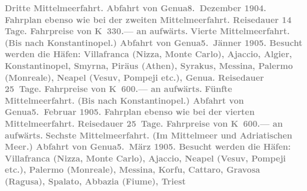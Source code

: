 {\begin{ledgroupsized}[t]{13cm}
           \pstart
           \textcolor{gray}{\textbf{\textbf{Dritte Mittelmeerfahrt.}
                  Abfahrt von Genua\textbf{8. Dezember 1904}. Fahrplan ebenso wie bei der zweiten Mittelmeerfahrt. Reisedauer 14 Tage. Fahrpreise von \textbf{K 330.—} an aufwärts.}}\pend
           \pstart
           \textcolor{gray}{\textbf{\textbf{Vierte Mittelmeerfahrt.}
                  (Bis nach Konstantinopel.) Abfahrt von Genua\textbf{5. Jänner 1905}. Besucht werden die Häfen: Villafranca
                     (Nizza, Monte
                     Carlo), Ajaccio, Algier, Konstantinopel, Smyrna, Piräus (Athen), Syrakus, Messina, Palermo (Monreale), Neapel (Vesuv, Pompeji etc.), Genua. Reisedauer 25 Tage. Fahrpreise von \textbf{K 600.—} an aufwärts.}}\pend
           \pstart
           \textcolor{gray}{\textbf{\textbf{Fünfte Mittelmeerfahrt.}
                  (Bis nach Konstantinopel.) Abfahrt von Genua\textbf{5. Februar 1905}. Fahrplan ebenso wie bei der vierten Mittelmeerfahrt. Reisedauer 25 Tage. Fahrpreise von \textbf{K 600.—} an aufwärts.}}\pend
           \pstart
           \textcolor{gray}{\textbf{\textbf{Sechste Mittelmeerfahrt.}
                  (Im Mittelmeer und Adriatischen Meer.) Abfahrt
                  von Genua\textbf{5. März 1905}. Besucht werden die Häfen: Villafranca
                     (Nizza, Monte
                     Carlo), Ajaccio, Neapel (Vesuv, Pompeji etc.), Palermo (Monreale), Messina, Korfu, Cattaro, Gravosa (Ragusa), Spalato, Abbazia (Fiume), Triest
}}
\end{ledgroupsized}}
